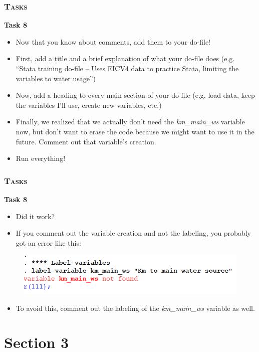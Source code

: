 \documentclass[10pt]{beamer}
\begin{document}
	
	\begin{frame}
		\frametitle{\textsc{Tasks}}
		\begin{center}	
			\Large\textbf{Task 8}
		\end{center}	
		\begin{itemize}	
			\item Now that you know about comments, add them to your do-file! 
			\item First, add a title and a brief explanation of what your do-file does (e.g. “Stata training do-file – Uses EICV4 data to practice Stata, limiting the variables to water usage”)
			\item Now, add a heading to every main section of your do-file (e.g. load data, keep the variables I’ll use, create new variables, etc.)
			\item Finally, we realized that we actually don’t need the \textit{km\_main\_ws}  variable now, but don’t want to erase the code because we might want to use it in the future. Comment out that variable's creation.
			\item Run everything!
		\end{itemize}

	\end{frame}
	
		
	\begin{frame}
		\frametitle{\textsc{Tasks}}
		\begin{center}	
			\Large\textbf{Task 8}
		\end{center}	
		\begin{itemize}	
			\item Did it work? 

			\item If you comment out the variable creation and not the labeling, you probably got an error like this:
		\end{itemize}
		\begin{figure}[H] 
			\centering
			\includegraphics[width=0.9\linewidth]{error}
		\end{figure}
		\begin{itemize}
			\item To avoid this, comment out the labeling of the \textit{km\_main\_ws} variable as well. 
		\end{itemize}

	\end{frame}
		
	
	
\section{Section 3}

	
\end{document}

